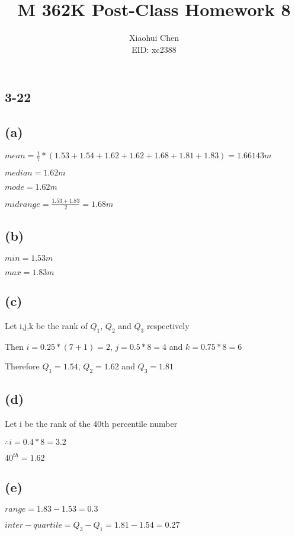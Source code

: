 \documentclass[12pt]{article}
\author{Xiaohui Chen \\EID: xc2388}
\title{M 362K Post-Class Homework 8}
\begin{document}
\maketitle
\begin{spacing}{2.0}

\section*{3-22}

\subsection*{(a)}

$mean=\frac{1}{7}*(1.53+1.54+1.62+1.62+1.68+1.81+1.83)= 1.66143 m$

$median= 1.62m$

$mode= 1.62m$

$midrange= \frac{1.53+1.83}{2}=1.68 m$

\subsection*{(b)}

$min=1.53 m$

$max=1.83 m$

\subsection*{(c)}

Let i,j,k be the rank of $Q_1$, $Q_2$ and $Q_3$ respectively

Then $i=0.25*(7+1)= 2$, $j=0.5*8=4$ and $k=0.75*8= 6$

Therefore $Q_1=1.54$, $Q_2=1.62$ and $Q_3=1.81$

\subsection*{(d)}

Let i be the rank of the 40th percentile number

$\therefore i=0.4*8=3.2$

$40^{th}= 1.62$

\subsection*{(e)}

$range=1.83-1.53=0.3$

$inter-quartile= Q_3-Q_1=1.81-1.54= 0.27$


\end{spacing}
\end{document}

